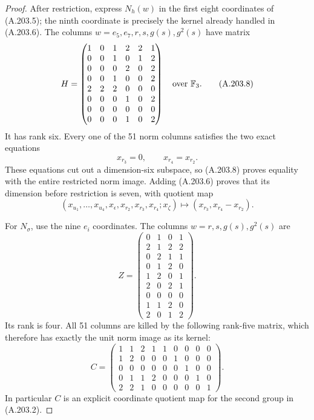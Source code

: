 \begin{proof}
After restriction, express \(N_h(w)\) in the first
eight coordinates of (A.203.5); the ninth coordinate is
precisely the kernel already handled in (A.203.6).
The columns \(w=e_5,e_7,r,s,g(s),g^2(s)\) have matrix
\[
 H=\begin{pmatrix}
 1&0&1&2&2&1\\
 0&0&1&0&1&2\\
 0&0&0&2&0&2\\
 0&0&1&0&0&2\\
 2&2&2&0&0&0\\
 0&0&0&1&0&2\\
 0&0&0&0&0&0\\
 0&0&0&1&0&2
 \end{pmatrix}\quad\text{over }\mathbb F_3.
\tag{A.203.8}
\]
It has rank six.  Every one of the 51 norm columns
satisfies the two exact equations
\[
                       x_{r_3}=0,\qquad x_{r_4}=x_{r_2}.
\tag{A.203.9}
\]
These equations cut out a dimension-six subspace, so
(A.203.8) proves equality with the entire restricted
norm image.  Adding (A.203.6) proves that its dimension
before restriction is seven, with quotient map
\[
  (x_{u_1},\ldots,x_{u_4},x_\epsilon,x_{r_2},x_{r_3},
                x_{r_4};x_\zeta)
                  \longmapsto(x_{r_3},x_{r_4}-x_{r_2}).
\tag{A.203.10}
\]

For \(N_\sigma\), use the nine \(e_i\) coordinates.
The columns \(w=r,s,g(s),g^2(s)\) are
\[
 Z=\begin{pmatrix}
 0&1&0&1\\
 2&1&2&2\\
 0&2&1&1\\
 0&1&2&0\\
 1&2&0&1\\
 2&0&2&1\\
 0&0&0&0\\
 1&1&2&0\\
 2&0&1&2
 \end{pmatrix}.
\tag{A.203.11}
\]
Its rank is four.  All 51 columns are killed by the
following rank-five matrix, which therefore has exactly
the unit norm image as its kernel:
\[
 C=\begin{pmatrix}
 1&1&2&1&1&0&0&0&0\\
 1&2&0&0&0&1&0&0&0\\
 0&0&0&0&0&0&1&0&0\\
 0&1&1&2&0&0&0&1&0\\
 2&2&1&0&0&0&0&0&1
 \end{pmatrix}.
\tag{A.203.12}
\]
In particular \(C\) is an explicit coordinate quotient
map for the second group in (A.203.2).


\end{proof}
